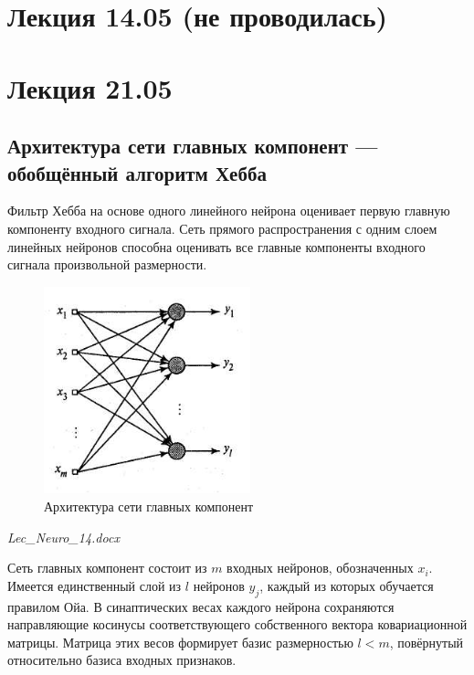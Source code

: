\documentclass{article}
\numberwithin{equation}{subsection}
\begin{document}
\section{Лекция 14.05 (не проводилась)}




\section{Лекция 21.05}

\subsection{Архитектура сети главных компонент --- обобщённый алгоритм Хебба}

Фильтр Хебба на основе одного линейного нейрона оценивает первую главную компоненту 
входного сигнала. Сеть прямого распространения с одним слоем линейных нейронов 
способна оценивать все главные компоненты входного сигнала произвольной размерности.

\begin{figure}[htbp]
    \centering
    \includegraphics[height=6cm]{lec_neuro_14_8_6.png}
    \caption{Архитектура сети главных компонент}
    \label{lec_neuro_8_6}
\end{figure}

\begin{myquote}
    \textit{Lec\_Neuro\_14.docx}
\end{myquote}

Сеть главных компонент состоит из $m$ входных нейронов, обозначенных $x_i$.
Имеется единственный слой из $l$ нейронов $y_j$, каждый из которых обучается правилом Ойа. 
В синаптических весах каждого нейрона сохраняются направляющие косинусы соответствующего 
собственного вектора ковариационной матрицы. Матрица этих весов формирует базис размерностью $l<m$, 
повёрнутый относительно базиса входных признаков.
\end{document}
